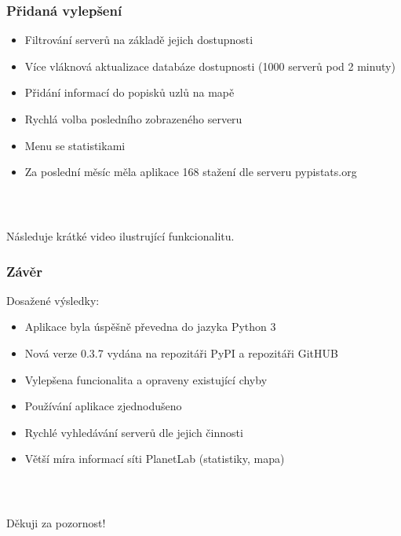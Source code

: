 \documentclass[%
  12pt,       				%
	t,                  %
	aspectratio=1610,   %
	unicode,						%
]{beamer}				    	%
\begin{document}
\begin{frame} 
\frametitle{Přidaná vylepšení}
\begin{itemize}
	\item Filtrování serverů na základě jejich dostupnosti
	\item Více vláknová aktualizace databáze dostupnosti (1000 serverů pod 2 minuty)
	\item Přidání informací do popisků uzlů na mapě
	\item Rychlá volba posledního zobrazeného serveru
	\item Menu se statistikami
	\item Za poslední měsíc měla aplikace 168 stažení dle serveru pypistats.org
\end{itemize}
\end{frame}

\begin{frame}[c] 
\frametitle{\mbox{ }}
\begin{center}
	{\Huge Následuje krátké video ilustrující funkcionalitu.}
\end{center}
\end{frame}


\begin{frame} 
	\frametitle{Závěr}
	Dosažené výsledky:
	\begin{itemize}
		\item Aplikace byla úspěšně převedna do jazyka Python 3
		\item Nová verze 0.3.7 vydána na repozitáři PyPI a repozitáři GitHUB
		\item Vylepšena funcionalita a opraveny existující chyby
		\item Používání aplikace zjednodušeno
		\item Rychlé vyhledávání serverů dle jejich činnosti
		\item Větší míra informací síti PlanetLab (statistiky, mapa)
	\end{itemize}
\end{frame}


\begin{frame}[c] 
	\frametitle{\mbox{ }}
	\begin{center}
		{\Huge Děkuji za pozornost!}
	\end{center}
\end{frame}

\end{document}
